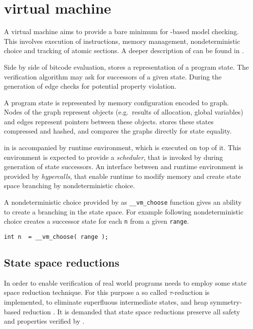 \section{\DIVINE virtual machine}

A \DIVINE virtual machine aims to provide a bare minimum for \LLVM-based
model checking. This involves execution of instructions, memory management,
nondeterministic choice and tracking of atomic sections. A deeper description of
\DIVM can be found in \cite{RockaiCB17}.

Side by side of \LLVM bitcode evaluation, \DIVM stores a representation of a
program state. The verification algorithm may ask \DIVM for
successors of a given state. During the generation of edge \DIVM checks for
potential property violation.

A program state is represented by memory configuration encoded to graph.
Nodes of the graph represent objects (e.g.~results of allocation, global
variables) and edges represent pointers between these objects.
\DIVM stores these states compressed and hashed, and compares the graphs
directly for state equality.

\DIVM in \DIVINE is accompanied by runtime environment, which is executed on top
of it. This environment is expected to provide a \emph{scheduler}, that is invoked
by \DIVM during generation of state successors. An interface between \DIVM and
runtime environment is provided by \emph{hypercalls}, that enable runtime to modify
memory and create state space branching by nondeterministic choice.

\begin{example}
A nondeterministic choice provided by \DIVM as \texttt{\_\_vm\_choose} function
gives an ability to create a branching in the state space. For example following nondeterministic
choice creates a successor state for each \texttt{n} from a given \texttt{range}.

\begin{verbatim}
int n  = __vm_choose( range );
\end{verbatim}

\end{example}
\subsection{State space reductions}

In order to enable verification of real world programs \DIVINE needs to employ
some state space reduction technique. For this purpose a so called
$\tau$-reduction is implemented, to eliminate superfluous intermediate states,
and heap symmetry-based reduction \cite{Rockai13} \cite{RockaiCB17}. It is demanded
that state space reductions preserve all safety and \LTL properties verified
by \DIVINE.

